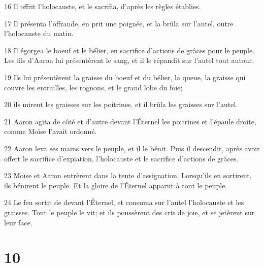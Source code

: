 \par 16 Il offrit l'holocauste, et le sacrifia, d'après les règles établies.
\par 17 Il présenta l'offrande, en prit une poignée, et la brûla sur l'autel, outre l'holocauste du matin.
\par 18 Il égorgea le boeuf et le bélier, en sacrifice d'actions de grâces pour le peuple. Les fils d'Aaron lui présentèrent le sang, et il le répandit sur l'autel tout autour.
\par 19 Ils lui présentèrent la graisse du boeuf et du bélier, la queue, la graisse qui couvre les entrailles, les rognons, et le grand lobe du foie;
\par 20 ils mirent les graisses sur les poitrines, et il brûla les graisses sur l'autel.
\par 21 Aaron agita de côté et d'autre devant l'Éternel les poitrines et l'épaule droite, comme Moïse l'avait ordonné.
\par 22 Aaron leva ses mains vers le peuple, et il le bénit. Puis il descendit, après avoir offert le sacrifice d'expiation, l'holocauste et le sacrifice d'actions de grâces.
\par 23 Moïse et Aaron entrèrent dans la tente d'assignation. Lorsqu'ils en sortirent, ils bénirent le peuple. Et la gloire de l'Éternel apparut à tout le peuple.
\par 24 Le feu sortit de devant l'Éternel, et consuma sur l'autel l'holocauste et les graisses. Tout le peuple le vit; et ils poussèrent des cris de joie, et se jetèrent sur leur face.

\chapter{10}

